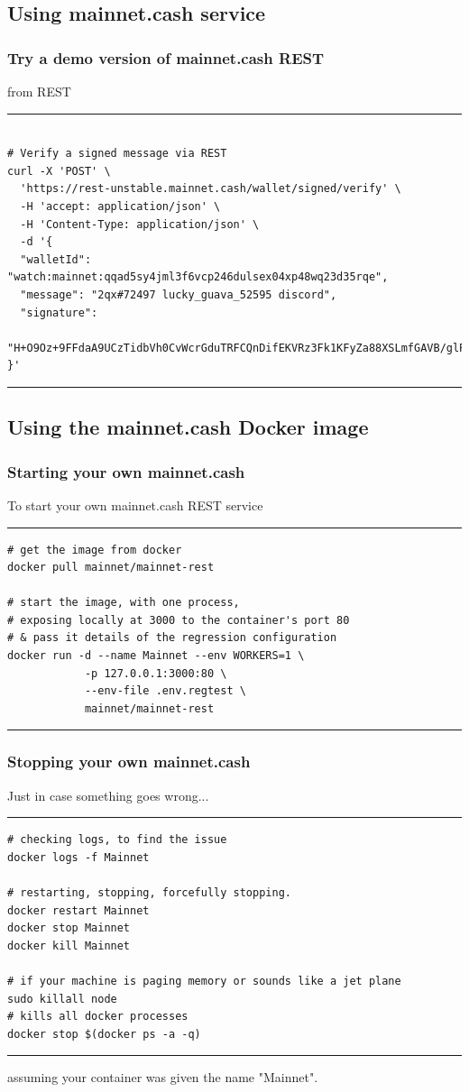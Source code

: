 \documentclass{beamer}
\begin{document}
\subsection[Unstable REST]{Using mainnet.cash service}

\begin{frame}[fragile]
  \frametitle{Try a demo version of mainnet.cash REST}
    from REST
  \rule{\textwidth}{0.4pt}
  \tiny
  \begin{verbatim}
    
# Verify a signed message via REST
curl -X 'POST' \
  'https://rest-unstable.mainnet.cash/wallet/signed/verify' \
  -H 'accept: application/json' \
  -H 'Content-Type: application/json' \
  -d '{
  "walletId": "watch:mainnet:qqad5sy4jml3f6vcp246dulsex04xp48wq23d35rqe",
  "message": "2qx#72497 lucky_guava_52595 discord",
  "signature": 
  "H+O9Oz+9FFdaA9UCzTidbVh0CvWcrGduTRFCQnDifEKVRz3Fk1KFyZa88XSLmfGAVB/glP8OFRJqSatZtzo8h9I="
}'

  \end{verbatim}
\rule{\textwidth}{0.6pt}
\end{frame}

\subsection[Docker image]{Using the mainnet.cash Docker image}

\begin{frame}[fragile]
    \frametitle{Starting your own mainnet.cash}
      To start your own mainnet.cash REST service
    \rule{\textwidth}{0.9pt}
    \tiny
    \begin{verbatim}
# get the image from docker
docker pull mainnet/mainnet-rest

# start the image, with one process, 
# exposing locally at 3000 to the container's port 80
# & pass it details of the regression configuration
docker run -d --name Mainnet --env WORKERS=1 \ 
            -p 127.0.0.1:3000:80 \ 
            --env-file .env.regtest \
            mainnet/mainnet-rest
    \end{verbatim}
\rule{\textwidth}{0.9pt}

\end{frame}

\begin{frame}[fragile]
    \frametitle{Stopping your own mainnet.cash}
      Just in case something \alert{goes wrong}...
    \rule{\textwidth}{0.6pt}
    \tiny
    \begin{verbatim}
# checking logs, to find the issue
docker logs -f Mainnet

# restarting, stopping, forcefully stopping.
docker restart Mainnet
docker stop Mainnet
docker kill Mainnet

# if your machine is paging memory or sounds like a jet plane
sudo killall node 
# kills all docker processes
docker stop $(docker ps -a -q)
    \end{verbatim}
\rule{\textwidth}{0.6pt}
assuming your container was given the name "Mainnet".\\
\end{frame}
\end{document}
